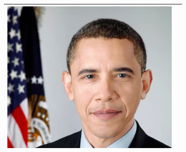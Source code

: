 \documentclass[12pt, a4paper]{article}
\begin{document}
\begin{longtable}{|c|c|}
\begin{minipage}{.29\textwidth}
    \includegraphics[width=\textwidth,height=\textheight,keepaspectratio]{images/obama_res}
  \end{minipage} \\
    \hline
\end{longtable}
\pagebreak
\end{document}
